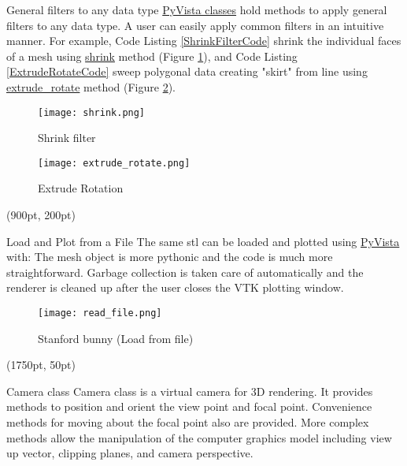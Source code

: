 \documentclass[final]{beamer}
\begin{document}
\begin{frame}[fragile]
\begin{textblock*}{800pt}
\begin{block}{General filters to any data type}
\href{https://docs.pyvista.org/core/filters.html}{PyVista classes} hold methods to apply general filters to any data type.
A user can easily apply common filters in an intuitive manner.
For example,
Code Listing \ref{ShrinkFilterCode} shrink the individual faces of a mesh
using \href{https://docs.pyvista.org/core/filters.html#pyvista.DataSetFilters.shrink}{shrink} method (Figure \ref{ShrinkFilterFigure}), and
Code Listing \ref{ExtrudeRotateCode} sweep polygonal data creating "skirt" from line
using \href{https://docs.pyvista.org/core/filters.html#pyvista.PolyDataFilters.extrude_rotate}{extrude\_rotate} method (Figure \ref{ExtrudeRotateFigure}).

\begin{figure}
\texttt{[image: shrink.png]}
\caption{Shrink filter}\label{ShrinkFilterFigure}
\end{figure}

\begin{figure}
\texttt{[image: extrude\_rotate.png]}
\caption{Extrude Rotation}\label{ExtrudeRotateFigure}
\end{figure}
\end{block}
\end{textblock*}

\begin{textblock*}{800pt}(900pt, 200pt)
\begin{block}{Load and Plot from a File}
The same stl can be loaded and plotted using \href{https://pypi.org/project/pyvista/}{PyVista} with:
The mesh object is more pythonic and the code is much more straightforward.
Garbage collection is taken care of automatically and the renderer is cleaned up after the user closes the VTK plotting window.

\begin{figure}
\texttt{[image: read\_file.png]}
\caption{Stanford bunny (Load from file)}
\end{figure}
\end{block}
\end{textblock*}

\begin{textblock*}{800pt}(1750pt, 50pt)
\begin{block}{Camera class}
Camera class is a virtual camera for 3D rendering.
It provides methods to position and orient the view point and focal point.
Convenience methods for moving about the focal point also are provided.
More complex methods allow the manipulation of the computer graphics model including view up vector, clipping planes, and camera perspective.


\end{block}
\end{textblock*}
\end{frame}
\end{document}
